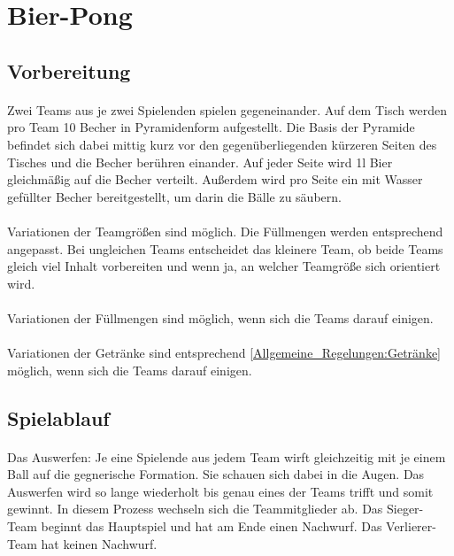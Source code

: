 \section{Bier-Pong}
\subsection{Vorbereitung}
\paragraph{}
Zwei Teams aus je zwei Spielenden spielen gegeneinander.
Auf dem Tisch werden pro Team 10 Becher in Pyramidenform aufgestellt.
Die Basis der Pyramide befindet sich dabei mittig kurz vor den gegenüberliegenden kürzeren Seiten des Tisches und die Becher berühren einander.
Auf jeder Seite wird 1l Bier gleichmäßig auf die Becher verteilt.
Außerdem wird pro Seite ein mit Wasser gefüllter Becher bereitgestellt, um darin die Bälle zu säubern.

\paragraph{}
Variationen der Teamgrößen sind möglich.
Die Füllmengen werden entsprechend angepasst.
Bei ungleichen Teams entscheidet das kleinere Team, ob beide Teams gleich viel Inhalt vorbereiten und wenn ja, an welcher Teamgröße sich orientiert wird.

\paragraph{}
Variationen der Füllmengen sind möglich, wenn sich die Teams darauf einigen.

\paragraph{}
Variationen der Getränke sind entsprechend \ref{Allgemeine_Regelungen:Getränke} möglich, wenn sich die Teams darauf einigen.


\subsection{Spielablauf} \label{Bier-Pong:Spielablauf}
\paragraph{}
Das Auswerfen: Je eine Spielende aus jedem Team wirft gleichzeitig mit je einem Ball auf die gegnerische Formation.
Sie schauen sich dabei in die Augen. Das Auswerfen wird so lange wiederholt bis genau eines der Teams trifft und somit gewinnt.
In diesem Prozess wechseln sich die Teammitglieder ab.
Das Sieger-Team beginnt das Hauptspiel und hat am Ende einen Nachwurf.
Das Verlierer-Team hat keinen Nachwurf.

